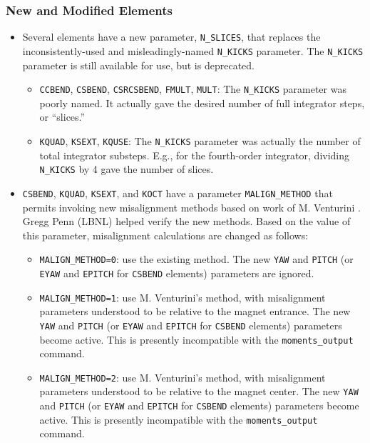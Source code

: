 \documentclass[11pt]{article}
\begin{document}
\subsubsection{New and Modified Elements}
\begin{itemize}
\item Several elements have a new parameter,  \verb|N_SLICES|, that replaces the inconsistently-used and misleadingly-named
  \verb|N_KICKS| parameter. The \verb|N_KICKS| parameter is still available for use, but is deprecated.
  \begin{itemize}
  \item \verb|CCBEND|, \verb|CSBEND|, \verb|CSRCSBEND|, \verb|FMULT|, \verb|MULT|: The \verb|N_KICKS| parameter was
    poorly named. It actually gave the desired number of full integrator steps, or ``slices.''
  \item \verb|KQUAD|, \verb|KSEXT|, \verb|KQUSE|: The \verb|N_KICKS| parameter was actually the number of total
    integrator substeps. E.g., for the fourth-order integrator, dividing \verb|N_KICKS| by 4 gave the number of slices.
  \end{itemize}
\item \verb|CSBEND|, \verb|KQUAD|, \verb|KSEXT|,  and \verb|KOCT| have a parameter \verb|MALIGN_METHOD| that permits
  invoking new misalignment methods based on work of M. Venturini \cite{Venturini2021}. Gregg Penn (LBNL) helped
  verify the new methods. Based on the value of this parameter, misalignment   calculations are changed as follows:
  \begin{itemize}
    \item \verb|MALIGN_METHOD=0|: use the existing method.
      The new \verb|YAW| and \verb|PITCH| (or \verb|EYAW| and \verb|EPITCH| for \verb|CSBEND| elements)
      parameters are ignored.
    \item \verb|MALIGN_METHOD=1|: use M. Venturini's method, with misalignment parameters understood to be relative
      to the magnet entrance. The new \verb|YAW| and \verb|PITCH| (or \verb|EYAW| and \verb|EPITCH| for \verb|CSBEND| elements)
      parameters become active. This is presently incompatible with the \verb|moments_output| command.
    \item \verb|MALIGN_METHOD=2|: use M. Venturini's method, with misalignment parameters understood to be relative
      to the magnet center. The new \verb|YAW| and \verb|PITCH| (or \verb|EYAW| and \verb|EPITCH| for \verb|CSBEND| elements)
      parameters become active. This is presently incompatible with the \verb|moments_output| command.

\end{itemize}
\end{itemize}
\end{document}
